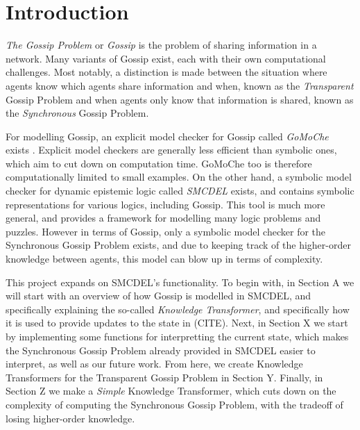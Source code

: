 \section{Introduction}

\textit{The Gossip Problem} or \textit{Gossip} is the problem of sharing information in a network. Many variants of Gossip exist, each with their own computational challenges. Most notably, a distinction is made between the situation where agents know which agents share information and when, known as the \textit{Transparent} Gossip Problem and when agents only know that information is shared, known as the \textit{Synchronous} Gossip Problem.

For modelling Gossip, an explicit model checker for Gossip called \textit{GoMoChe} exists \cite{gattinger2023gomoche}. Explicit model checkers are generally less efficient than symbolic ones, which aim to cut down on computation time. GoMoChe too is therefore computationally limited to small examples. On the other hand, a symbolic model checker for dynamic epistemic logic called \textit{SMCDEL} exists, and contains symbolic representations for various logics, including Gossip. This tool is much more general, and provides a framework for modelling many logic problems and puzzles. However in terms of Gossip, only a symbolic model checker for the Synchronous Gossip Problem exists, and due to keeping track of the higher-order knowledge between agents, this model can blow up in terms of complexity.

This project expands on SMCDEL's functionality. To begin with, in Section A we will start with an overview of how Gossip is modelled in SMCDEL, and specifically explaining the so-called \textit{Knowledge Transformer}, and specifically how it is used to provide updates to the state in (CITE). Next, in Section X we start by implementing some functions for interpretting the current state, which makes the Synchronous Gossip Problem already provided in SMCDEL easier to interpret, as well as our future work. From here, we create Knowledge Transformers for the Transparent Gossip Problem in Section Y. Finally, in Section Z we make a \textit{Simple} Knowledge Transformer, which cuts down on the complexity of computing the Synchronous Gossip Problem, with the tradeoff of losing higher-order knowledge. 



